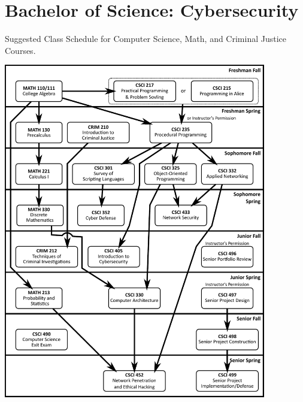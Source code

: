 %
\section*{Bachelor of Science: Cybersecurity}
\begin{center}
Suggested Class Schedule for Computer Science, Math, and Criminal Justice Courses.
% 

\includegraphics[width=0.86\textwidth]{images/PrerequisiteDiagram_BS_Cybersecurity}
\end{center}